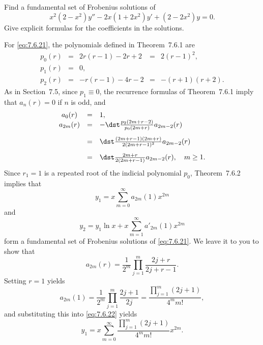 \setcounter{example}{2}
\setcounter{equation}{20}
\begin{example}
  \label{example:7.6.3} \rm Find a fundamental set of Frobenius solutions of
  \begin{equation}
    \label{eq:7.6.21}x^{2}(2-x^{2})y''-2x(1+2x^{2})y'+(2-2x^{2})y=0.
  \end{equation}
  Give explicit formulas for the coefficients in the solutions.
\end{example}
\setcounter{equation}{21}
\begin{examplesolution}
\solution For \eqref{eq:7.6.21}, the polynomials defined in Theorem~7.6.1 are
\[
  \begin{array}{ccccc}
    p_{0}(r) & = & 2r(r-1)-2r+2 & = & 2(r-1)^{2},  \\[5pt]
    p_{1}(r) & = & 0,            \\[5pt]
    p_{2}(r) & = & -r(r-1)-4r-2 & = & -(r+1)(r+2).
  \end{array}
\]
As in Section~7.5, since $p_{1}\equiv0$, the recurrence formulas of Theorem~7.6.1
imply that $a_{n}(r)=0$ if $n$ is odd, and
\[
  \begin{array}{ccl}
    a_{0}(r)  & = & 1,                                                  \\
    a_{2m}(r) & = & -\dst\frac{p_{2}(2m+r-2)}{p_{0}(2m+r)}a_{2m-2}(r)   \\[10pt]
              & = & \dst\frac{(2m+r-1)(2m+r)}{2(2m+r-1)^{2}}a_{2m-2}(r) \\[10pt]
              & = & \dst\frac{2m+r}{2(2m+r-1)}a_{2m-2}(r),\quad m\ge1.
  \end{array}
\]
Since $r_{1}=1$ is a repeated root of the indicial polynomial $p_{0}$, Theorem~7.6.2
implies that
\begin{equation}
  \label{eq:7.6.22}y_{1}=x\sum_{m=0}^{\infty}a_{2m}(1)x^{2m}
\end{equation}
and
\begin{equation}
  \label{eq:7.6.23}y_{2}=y_{1}\ln x+x\sum_{m=1}^{\infty}a'_{2m}(1)x^{2m}
\end{equation}
form a fundamental set of Frobenius solutions of \eqref{eq:7.6.21}. We leave it to you to show that
\begin{equation}
  \label{eq:7.6.24}a_{2m}(r)=\frac{1}{2^{m}}\prod_{j=1}^{m}\frac{2j+r}{2j+r-1}.
\end{equation}
Setting $r=1$ yields
\begin{equation}
  \label{eq:7.6.25}a_{2m}(1)=\frac{1}{2^{m}}\prod_{j=1}^{m}\frac{2j+1}{2j}=\frac{\prod_{j=1}^{m}(2j+1)}{4^{m}m!},
\end{equation}
and substituting this into \eqref{eq:7.6.22} yields
\[
  y_{1}=x\sum_{m=0}^{\infty}\frac{\prod_{j=1}^{m}(2j+1)}{4^{m}m!}x^{2m}.
\]


\end{examplesolution}

